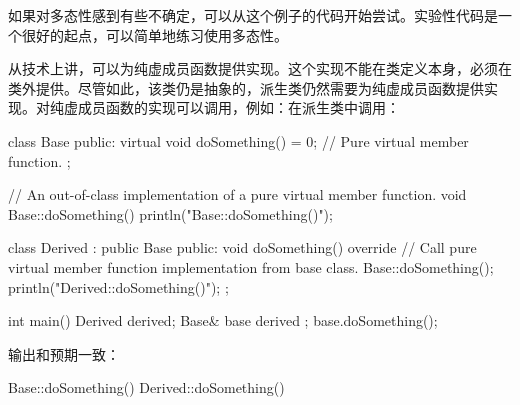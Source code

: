 如果对多态性感到有些不确定，可以从这个例子的代码开始尝试。实验性代码是一个很好的起点，可以简单地练习使用多态性。


从技术上讲，可以为纯虚成员函数提供实现。这个实现不能在类定义本身，必须在类外提供。尽管如此，该类仍是抽象的，派生类仍然需要为纯虚成员函数提供实现。对纯虚成员函数的实现可以调用，例如：在派生类中调用：

\begin{cpp}
class Base
{
    public:
        virtual void doSomething() = 0; // Pure virtual member function.
};

// An out-of-class implementation of a pure virtual member function.
void Base::doSomething() { println("Base::doSomething()"); }

class Derived : public Base
{
    public:
        void doSomething() override
        {
            // Call pure virtual member function implementation from base class.
            Base::doSomething();
            println("Derived::doSomething()");
        }
};

int main()
{
    Derived derived;
    Base& base { derived };
    base.doSomething();
}
\end{cpp}

输出和预期一致：

\begin{shell}
Base::doSomething()
Derived::doSomething()
\end{shell}





